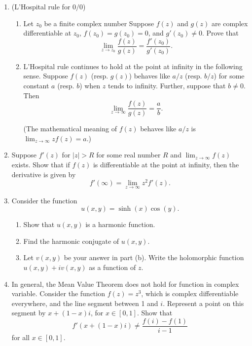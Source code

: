 \begin{enumerate}
\item (L'Hospital rule for $0/0$)

\begin{enumerate}
	\item Let $z_0$ be a finite complex number
 Suppose $f(z)$ and $g(z)$ are complex differentiable at $z_0$, $f(z_0)=g(z_0)=0$, and $g'(z_0)\neq 0$. Prove that
$$
\lim_{z\rightarrow z_0}  \frac{f(z)}{g(z)} = \frac{f'(z_0)}{g'(z_0)}.
$$ 
\item L'Hospital rule continues to hold at the point at infinity in the following sense. Suppose $f(z)$ (resp. $g(z)$) behaves like $a/z$ (resp. $b/z$) for some constant $a$ (resp. $b$) when $z$ tends to infinity. Further, suppose that $b\neq 0$. Then
$$
\lim_{z\rightarrow \infty}  \frac{f(z)}{g(z)} = \frac{a}{b}.
$$ 

(The mathematical meaning of $f(z)$ behaves like $a/z$ is $\lim_{z\rightarrow\infty} z f(z) = a$.)
\end{enumerate}

\item Suppose $f'(z)$ for $|z|>R$ for some real number $R$ and $\lim_{z\rightarrow \infty} f(z)$ exists. Show that if $f(z)$ is differentiable at the point at infinity, then the derivative is given by
	$$
	f'(\infty) = \lim_{z\rightarrow \infty} z^2 f'(z).
	$$


\item Consider the function
$$
u(x,y) = \sinh(x) \cos(y).
$$

\begin{enumerate}

\item Show that $u(x,y)$ is a harmonic function.

\item Find the harmonic conjugate of $u(x,y)$.

\item  Let $v(x,y)$ be your answer in part (b). Write the holomorphic function $u(x,y) + iv(x,y)$ as a function of $z$. 
\end{enumerate}



\item In general, the Mean Value Theorem does not hold for function in complex variable. Consider the function $f(z)=z^3$, which is complex differentiable everywhere, and the line segment between 1 and $i$. Represent a point on this segment by $x+(1-x)i$, for $x\in[0,1]$.  Show that 
$$f'(x+(1-x)i) \neq \frac{f(i)-f(1)}{i-1}$$ 
for all $x\in[0,1]$.


\end{enumerate}
